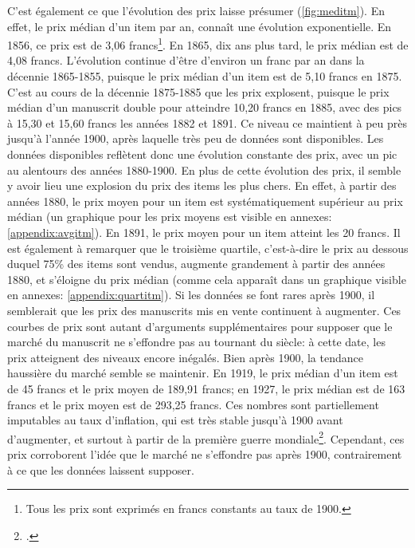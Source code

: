 C'est également ce que l'évolution des prix laisse présumer (\ref{fig:meditm}). En effet, le prix médian d'un item par an, connaît une évolution exponentielle. En 1856, ce prix est de 3,06 francs\footnote{Tous les prix sont exprimés en francs constants au taux de 1900.}. En 1865, dix ans plus tard, le prix médian est de 4,08 francs. L'évolution continue d'être d'environ un franc par an dans la décennie 1865-1855, puisque le prix médian d'un item est de 5,10 francs en 1875. C'est au cours de la décennie 1875-1885 que les prix explosent, puisque le prix médian d'un manuscrit double pour atteindre 10,20 francs en 1885, avec des pics à 15,30 et 15,60 francs les années 1882 et 1891. Ce niveau ce maintient à peu près jusqu'à l'année 1900, après laquelle très peu de données sont disponibles. Les données disponibles reflètent donc une évolution constante des prix, avec un pic au alentours des années 1880-1900. En plus de cette évolution des prix, il semble y avoir lieu une explosion du prix des items les plus chers. En effet, à partir des années 1880, le prix moyen pour un item est systématiquement supérieur au prix médian (un graphique pour les prix moyens est visible en annexes: \ref{appendix:avgitm}). En 1891, le prix moyen pour un item atteint les 20 francs. Il est également à remarquer que le troisième quartile, c'est-à-dire le prix au dessous duquel 75\% des items sont vendus, augmente grandement à partir des années 1880, et s'éloigne du prix médian (comme cela apparaît dans un graphique visible en annexes: \ref{appendix:quartitm}). Si les données se font rares après 1900, il semblerait que les prix des manuscrits mis en vente continuent à augmenter. Ces courbes de prix sont autant d'arguments supplémentaires pour supposer que le marché du manuscrit ne s'effondre pas au tournant du siècle: à cette date, les prix atteignent des niveaux encore inégalés. Bien après 1900, la tendance haussière du marché semble se maintenir. En 1919, le prix médian d'un item est de 45 francs et le prix moyen de 189,91 francs; en 1927, le prix médian est de 163 francs et le prix moyen est de 293,25 francs. Ces nombres sont partiellement imputables au taux d'inflation, qui est très stable jusqu'à 1900 avant d'augmenter, et surtout à partir de la première guerre mondiale\footcite{piketty_les_2001}. Cependant, ces prix corroborent l'idée que le marché ne s'effondre pas après 1900, contrairement à ce que les données laissent supposer.

